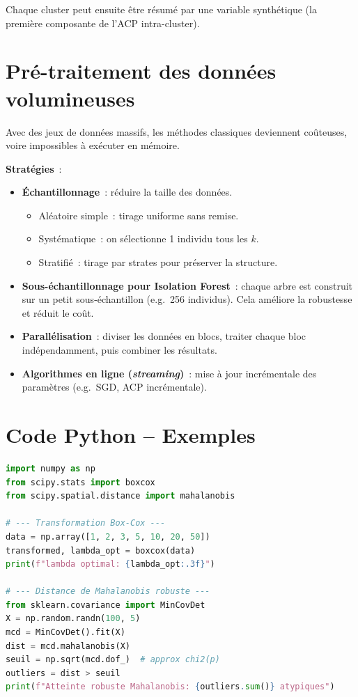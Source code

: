 \documentclass[a4paper,11pt]{article}
\theoremstyle{definition}
\theoremstyle{remark}
\begin{document}
Chaque cluster peut ensuite être résumé par une variable synthétique
(la première composante de l'ACP intra-cluster).

\section{Pré-traitement des données volumineuses}

Avec des jeux de données massifs, les méthodes classiques deviennent
coûteuses, voire impossibles à exécuter en mémoire.

\textbf{Stratégies}~:
\begin{itemize}
  \item \textbf{Échantillonnage}~: réduire la taille des données.
    \begin{itemize}
      \item Aléatoire simple~: tirage uniforme sans remise.
      \item Systématique~: on sélectionne 1 individu tous les $k$.
      \item Stratifié~: tirage par strates pour préserver la structure.
    \end{itemize}
  \item \textbf{Sous-échantillonnage pour Isolation Forest}~: chaque
    arbre est construit sur un petit sous-échantillon (e.g.\ 256
    individus). Cela améliore la robustesse et réduit le coût.
  \item \textbf{Parallélisation}~: diviser les données en blocs,
    traiter chaque bloc indépendamment, puis combiner les résultats.
  \item \textbf{Algorithmes en ligne (\textit{streaming})}~: mise à
    jour incrémentale des paramètres (e.g.\ SGD, ACP incrémentale).
\end{itemize}

\section{Code Python -- Exemples}

\begin{lstlisting}[language=Python, caption=Box-Cox et détection d'atypiques]
import numpy as np
from scipy.stats import boxcox
from scipy.spatial.distance import mahalanobis

# --- Transformation Box-Cox ---
data = np.array([1, 2, 3, 5, 10, 20, 50])
transformed, lambda_opt = boxcox(data)
print(f"lambda optimal: {lambda_opt:.3f}")

# --- Distance de Mahalanobis robuste ---
from sklearn.covariance import MinCovDet
X = np.random.randn(100, 5)
mcd = MinCovDet().fit(X)
dist = mcd.mahalanobis(X)
seuil = np.sqrt(mcd.dof_)  # approx chi2(p)
outliers = dist > seuil
print(f"Atteinte robuste Mahalanobis: {outliers.sum()} atypiques")
\end{lstlisting}
\end{document}
